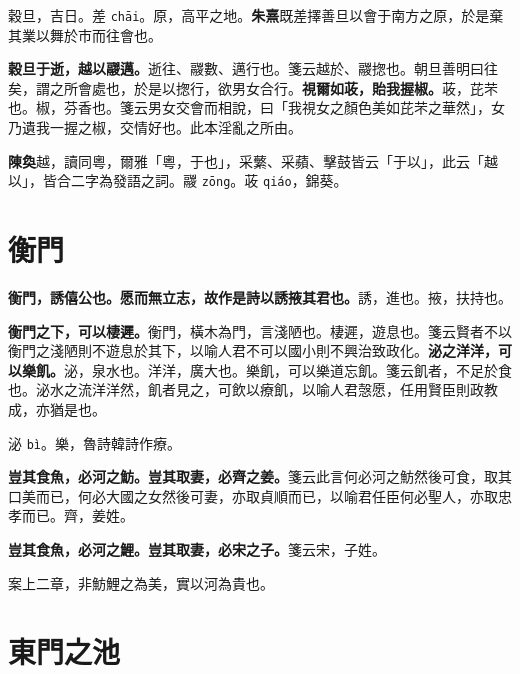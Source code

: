 \begin{quoting}穀旦，吉日。差 \texttt{chāi}。原，高平之地。\textbf{朱熹}既差擇善旦以會于南方之原，於是棄其業以舞於市而往會也。\end{quoting}

\textbf{穀旦于逝，越以鬷邁。}{\footnotesize 逝往、鬷數、邁行也。箋云越於、鬷揔也。朝旦善明曰往矣，謂之所會處也，於是以揔行，欲男女合行。}\textbf{視爾如荍，貽我握椒。}{\footnotesize 荍，芘芣也。椒，芬香也。箋云男女交會而相說，曰「我視女之顏色美如芘芣之華然」，女乃遺我一握之椒，交情好也。此本淫亂之所由。}

\begin{quoting}\textbf{陳奐}越，讀同粵，爾雅「粵，于也」，采蘩、采蘋、擊鼓皆云「于以」，此云「越以」，皆合二字為發語之詞。鬷 \texttt{zōng}。荍 \texttt{qiáo}，錦葵。\end{quoting}

\section{衡門}


\textbf{衡門，誘僖公也。愿而無立志，故作是詩以誘掖其君也。}{\footnotesize 誘，進也。掖，扶持也。}

\textbf{衡門之下，可以棲遲。}{\footnotesize 衡門，橫木為門，言淺陋也。棲遲，遊息也。箋云賢者不以衡門之淺陋則不遊息於其下，以喻人君不可以國小則不興治致政化。}\textbf{泌之洋洋，可以樂飢。}{\footnotesize 泌，泉水也。洋洋，廣大也。樂飢，可以樂道忘飢。箋云飢者，不足於食也。泌水之流洋洋然，飢者見之，可飲以療飢，以喻人君愨愿，任用賢臣則政教成，亦猶是也。}

\begin{quoting}泌 \texttt{bì}。樂，魯詩韓詩作療。\end{quoting}

\textbf{豈其食魚，必河之魴。豈其取妻，必齊之姜。}{\footnotesize 箋云此言何必河之魴然後可食，取其口美而已，何必大國之女然後可妻，亦取貞順而已，以喻君任臣何必聖人，亦取忠孝而已。齊，姜姓。}

\textbf{豈其食魚，必河之鯉。豈其取妻，必宋之子。}{\footnotesize 箋云宋，子姓。}

\begin{quoting}案上二章，非魴鯉之為美，實以河為貴也。\end{quoting}

\section{東門之池}


